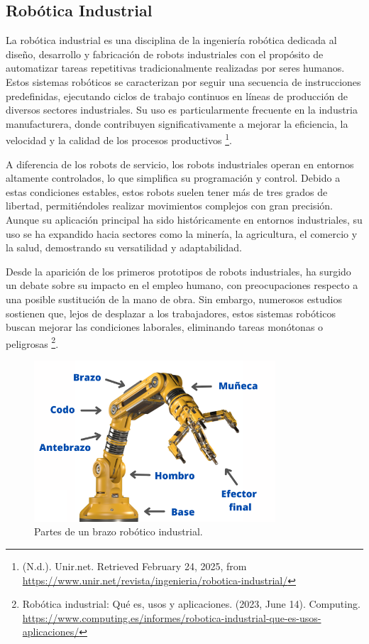\subsection{Robótica Industrial}

La robótica industrial es una disciplina de la ingeniería robótica dedicada al diseño, desarrollo y fabricación de robots industriales con el propósito de automatizar tareas repetitivas tradicionalmente realizadas por seres humanos. Estos sistemas robóticos se caracterizan por seguir una secuencia de instrucciones predefinidas, ejecutando ciclos de trabajo continuos en líneas de producción de diversos sectores industriales. Su uso es particularmente frecuente en la industria manufacturera, donde contribuyen significativamente a mejorar la eficiencia, la velocidad y la calidad de los procesos productivos \footnote{(N.d.). Unir.net. Retrieved February 24, 2025, from \url{https://www.unir.net/revista/ingenieria/robotica-industrial/}}. 

A diferencia de los robots de servicio, los robots industriales operan en entornos altamente controlados, lo que simplifica su programación y control. Debido a estas condiciones estables, estos robots suelen tener más de tres grados de libertad, permitiéndoles realizar movimientos complejos con gran precisión. Aunque su aplicación principal ha sido históricamente en entornos industriales, su uso se ha expandido hacia sectores como la minería, la agricultura, el comercio y la salud, demostrando su versatilidad y adaptabilidad. 

Desde la aparición de los primeros prototipos de robots industriales, ha surgido un debate sobre su impacto en el empleo humano, con preocupaciones respecto a una posible sustitución de la mano de obra. Sin embargo, numerosos estudios sostienen que, lejos de desplazar a los trabajadores, estos sistemas robóticos buscan mejorar las condiciones laborales, eliminando tareas monótonas o peligrosas \footnote{Robótica industrial: Qué es, usos y aplicaciones. (2023, June 14). Computing. \url{https://www.computing.es/informes/robotica-industrial-que-es-usos-aplicaciones/}}. 

\begin{figure} [h!]
  \begin{center}
    \includegraphics[width=9cm]{figs/brazo_industrial}
  \end{center}
  \caption{\centering Partes de un brazo robótico industrial.}
  \label{fig:brazo_industrials}
\end{figure}

